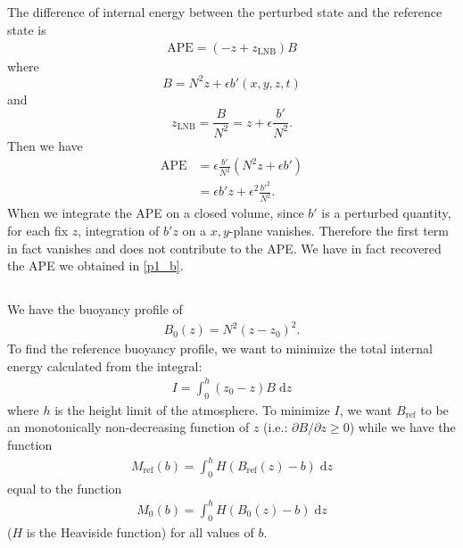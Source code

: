 \documentclass[11pt,letterpaper]{book}
\theoremstyle{definition}
\newcommand{\de}{\mathrm{d}}
\newcommand{\pe}{\partial}
\newcommand{\APE}{\text{APE}}
\begin{document}
\subsection{}
The difference of internal energy between the perturbed state and the reference state is
\begin{align*}
\APE = (-z+z_\text{LNB})B
\end{align*}
where 
$$B = N^2z+\epsilon b'(x,y,z,t)$$ 
and 
$$z_\text{LNB} = \frac{B}{N^2} = z+\epsilon \frac{b'}{N^2}.$$ 
Then we have
\begin{align*}
\APE &= \epsilon \frac{b'}{N^2}(N^2z+\epsilon b')\\
&=\epsilon b'z+\epsilon^2 \frac{b'^2}{N^2}.
\end{align*}
When we integrate the APE on a closed volume, since $b'$ is a perturbed quantity, for each fix $z$, integration of $b'z$ on a $x,y$-plane vanishes. Therefore the first term in fact vanishes and does not contribute to the APE. We have in fact recovered the APE we obtained in \ref{p1_b}.

\subsection{}
We have the buoyancy profile of 
\begin{align*}
B_0(z) = N^2(z-z_0)^2.
\end{align*}
To find the reference buoyancy profile, we want to minimize the total internal energy calculated from the integral:
\begin{align*}
I = \int^{h}_0 (z_0-z)B\;\de z
\end{align*}
where $h$ is the height limit of the atmosphere. To minimize $I$, we want $B_\text{ref}$ to be an monotonically non-decreasing function of $z$ (i.e.: $\pe B/\pe z\geq 0$) while we have the function
\begin{align*}
M_\text{ref}(b) = \int^{h}_0 H(B_\text{ref}(z)-b) \;\de z
\end{align*}
equal to the function
\begin{align*}
M_0(b) = \int^{h}_0 H(B_0(z)-b) \;\de z
\end{align*}
($H$ is the Heaviside function) for all values of $b$. 
\end{document}
